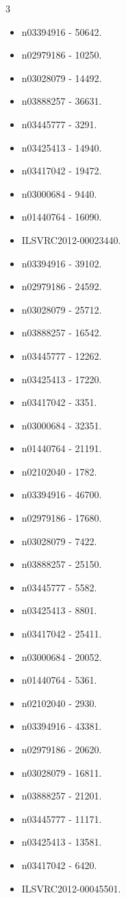 \begin{multicols}{3}

\begin{itemize}

\item n03394916 - 50642.
\item n02979186 - 10250.
\item n03028079 - 14492.
\item n03888257 - 36631.
\item n03445777 - 3291.
\item n03425413 - 14940.
\item n03417042 - 19472.
\item n03000684 - 9440.
\item n01440764 - 16090.
\item ILSVRC2012-00023440.
\item n03394916 - 39102.
\item n02979186 - 24592.
\item n03028079 - 25712.
\item n03888257 - 16542.
\item n03445777 - 12262.
\item n03425413 - 17220.
\item n03417042 - 3351.
\item n03000684 - 32351.
\item n01440764 - 21191.
\item n02102040 - 1782.
\item n03394916 - 46700.
\item n02979186 - 17680.
\item n03028079 - 7422.
\item n03888257 - 25150.
\item n03445777 - 5582.
\item n03425413 - 8801.
\item n03417042 - 25411.
\item n03000684 - 20052.
\item n01440764 - 5361.
\item n02102040 - 2930.
\item n03394916 - 43381.
\item n02979186 - 20620.
\item n03028079 - 16811.
\item n03888257 - 21201.
\item n03445777 - 11171.
\item n03425413 - 13581.
\item n03417042 - 6420.
\item ILSVRC2012-00045501.

\end{itemize}
\end{multicols}
